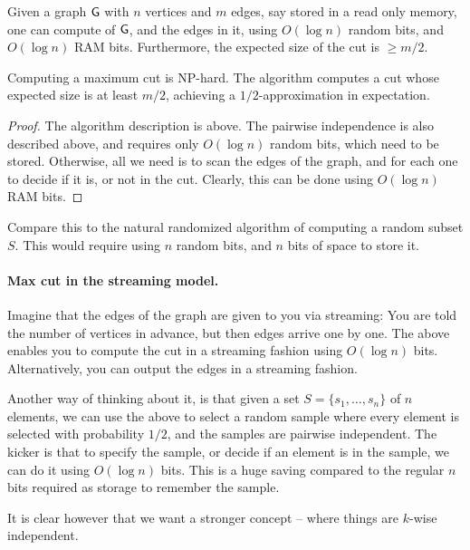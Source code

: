 \begin{lemma}
    Given a graph $\mathsf{G}$ with $n$ vertices and $m$ edges, say stored
    in a read only memory, one can compute  of $\mathsf{G}$, and
    the edges in it, using $O( \log n)$ random bits, and $O(\log n)$
    RAM bits. Furthermore, the expected size of the cut is $\geq m/2$.
\end{lemma}

Computing a maximum cut is NP-hard. The algorithm computes a cut whose
expected size is at least $m/2$, achieving a $1/2$-approximation in
expectation.

\begin{proof}
    The algorithm description is above. The pairwise independence is
    also described above, and requires only $O( \log n)$ random bits,
    which need to be stored. Otherwise, all we need is to scan the
    edges of the graph, and for each one to decide if it is, or not in
    the cut. Clearly, this can be done using $O( \log n)$ RAM bits.
\end{proof}

Compare this to the natural randomized algorithm of computing a random
subset $S$. This would require using $n$ random bits, and $n$ bits of
space to store it.


\paragraph*{Max cut in the streaming model.}

Imagine that the edges of the graph are given to you via streaming:
You are told the number of vertices in advance, but then edges arrive
one by one. The above enables you to compute the cut in a streaming
fashion using $O( \log n)$ bits. Alternatively, you can output the
edges in a streaming fashion.

Another way of thinking about it, is that given a set
$S=\{s_1, \ldots, s_n\}$ of $n$ elements, we can use the above to
select a random sample where every element is selected with
probability $1/2$, and the samples are pairwise independent. The kicker
is that to specify the sample, or decide if an element is in the
sample, we can do it using $O( \log n)$ bits. This is a huge saving
compared to the regular $n$ bits required as storage to remember the
sample.

It is clear however that we want a stronger concept -- where things
are $k$-wise independent.




